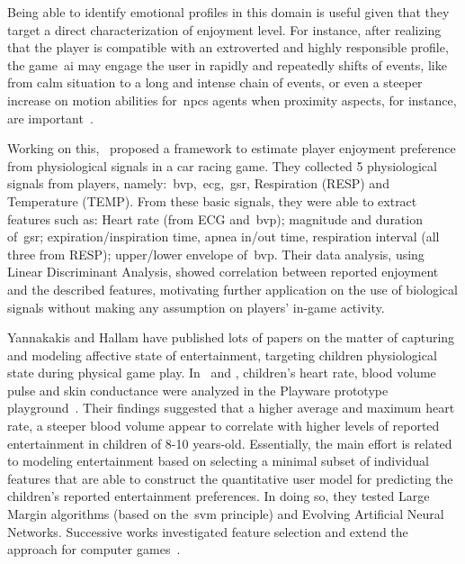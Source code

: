 Being able to identify emotional profiles in this domain is useful given that they target a direct characterization of enjoyment level. For instance, after realizing that the player is compatible with an extroverted and highly responsible profile, the game~\gls{ai} may engage the user in rapidly and repeatedly shifts of events, like from calm situation to a long and intense chain of events, or even a steeper increase on motion abilities for~\gls{npc}s agents when proximity aspects, for instance, are important~\citep{bakkes_player_2012}.

Working on this,~\cite{tognetti_modeling_2010} proposed a framework to estimate player enjoyment preference from physiological signals in a car racing game. They collected 5 physiological signals from players, namely:~\gls{bvp},~\gls{ecg},~\gls{gsr}, Respiration (RESP) and Temperature (TEMP). From these basic signals, they were able to extract features such as: Heart rate (from ECG and~\gls{bvp}); magnitude and duration of~\gls{gsr}; expiration/inspiration time, apnea in/out time, respiration interval (all three from RESP); upper/lower envelope of~\gls{bvp}. Their data analysis, using Linear Discriminant Analysis, showed correlation between reported enjoyment and the described features, motivating further application on the use of biological signals without making any assumption on players' in-game activity.

Yannakakis and Hallam have published lots of papers on the matter of capturing and modeling affective state of entertainment, targeting children physiological state during physical game play. In~\cite{yannakakis_modeling_2006} and \cite{yannakakis_entertainment_2008}, children's heart rate, blood volume pulse and skin conductance were analyzed in the Playware prototype playground~\citep{lund_playware_2005}. Their findings suggested that a higher average and maximum heart rate, a steeper blood volume appear to correlate with higher levels of reported entertainment in children of 8-10 years-old. Essentially, the main effort is related to modeling entertainment based on selecting a minimal subset of individual features that are able to construct the quantitative user model for predicting the children's reported entertainment preferences. In doing so, they tested Large Margin algorithms (based on the~\gls{svm} principle) and Evolving Artificial Neural Networks. Successive works investigated feature selection and extend the approach for computer games~\citep{yannakakis_towards_2006,yannakakis_entertainment_2007,yannakakis_feature_2007,yannakakis_entertainment_2008-1}. 

